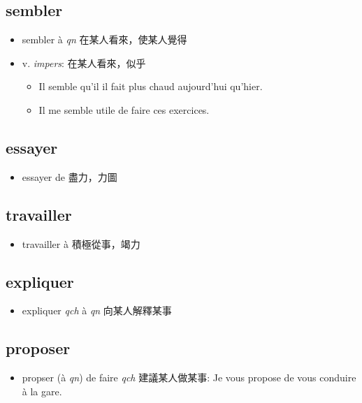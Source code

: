 \documentclass{book}
\begin{document}
        \subsection{sembler}
            \begin{itemize}
                \item sembler à \textit{qn} 在某人看來，使某人覺得
                \item v. \textit{impers}: 在某人看來，似乎 
                    \begin{itemize}
                        \item Il semble qu'il il fait plus chaud aujourd'hui qu'hier.
                        \item Il me semble utile de faire ces exercices.
                    \end{itemize}
            \end{itemize}

        \subsection{essayer}
            \begin{itemize}
                \item essayer de 盡力，力圖
            \end{itemize}

        \subsection{travailler}
            \begin{itemize}
                \item travailler à 積極從事，竭力
            \end{itemize}

        \subsection{expliquer}
            \begin{itemize}
                \item expliquer \textit{qch} à \textit{qn} 向某人解釋某事
            \end{itemize}

        \subsection{proposer}
            \begin{itemize}
                \item propser (à \textit{qn}) de faire \textit{qch} 建議某人做某事: Je vous propose de vous conduire à la gare.
            \end{itemize}
        
\end{document}
